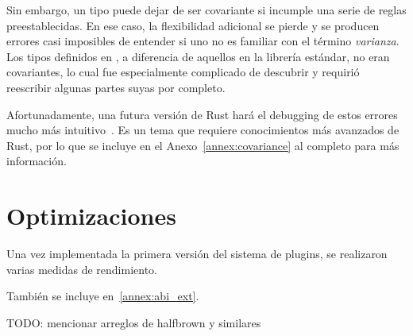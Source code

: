 Sin embargo, un tipo puede dejar de ser covariante si incumple una serie de
reglas preestablecidas. En ese caso, la flexibilidad adicional se pierde y se
producen errores casi imposibles de entender si uno no es familiar con el
término \emph{varianza}. Los tipos definidos en \abistable, a diferencia de
aquellos en la librería estándar, no eran covariantes, lo cual fue especialmente
complicado de descubrir y requirió reescribir algunas partes suyas por completo.

Afortunadamente, una futura versión de Rust hará el debugging de estos errores
mucho más intuitivo~\cite{smarterchecker}. Es un tema que requiere conocimientos
más avanzados de Rust, por lo que se incluye en el Anexo~\ref{annex:covariance}
al completo para más información.

\section{Optimizaciones}

Una vez implementada la primera versión del sistema de plugins, se realizaron
varias medidas de rendimiento.

También se incluye en~\ref{annex:abi_ext}.

TODO: mencionar arreglos de halfbrown y similares
